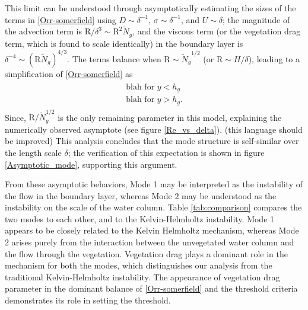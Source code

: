 \documentclass[aps,prl,twocolumn,superscriptaddress,10pt]{revtex4-1}  %
\newcommand{\hg}{h_g}
\newcommand{\Rey}{\text{R}}
\newcommand{\Ndg}{\tilde{N}_g}
\begin{document}
This limit can be understood through asymptotically estimating the sizes of the terms in \eqref{Orr-somerfield} using $D\sim \delta^{-1}$, $\sigma \sim \delta^{-1}$, and $U\sim \delta$; the magnitude of the advection term is $\Rey/\delta^3 \sim \Rey^2 \Ndg $, and the viscous term (or the vegetation drag term, which is found to scale identically) in the boundary layer is $\delta^{-4} \sim (\Rey \Ndg)^{4/3}$. 
The terms balance when $\Rey \sim {\Ndg}^{1/2}$ (or $\Rey \sim H/\delta$), leading to a simplification of \eqref{Orr-somerfield} as
\begin{align}
 \begin{split}
  \text{blah for $y<\hg$} \\
  \text{blah for $y>\hg$.}
 \end{split}
\end{align}
Since, $\Rey/\Ndg^{1/2}$ is the only remaining parameter in this model, explaining the numerically observed asymptote (see figure \ref{Re_vs_delta}). (this language should be improved)
This analysis concludes that the mode structure is self-similar over the length scale $\delta$; the verification of this expectation is shown in figure \ref{Asymptotic_mode}, supporting this argument.

From these asymptotic behaviors, Mode 1 may be interpreted as the instability of the flow in the boundary layer, whereas Mode 2 may be understood as the instability on the scale of the water column. 
Table \ref{tab:comparison} compares the two modes to each other, and to the Kelvin-Helmholtz instability. 
Mode 1 appears to be closely related to the Kelvin Helmholtz mechanism, whereas Mode 2 arises purely from the interaction between the unvegetated water column and the flow through the vegetation. 
Vegetation drag plays a dominant role in the mechanism for both the modes, which distinguishes our analysis from the traditional Kelvin-Helmholtz instability. 
The appearance of vegetation drag parameter in the dominant balance of \eqref{Orr-somerfield} and the threshold criteria demonstrates its role in setting the threshold.
\end{document}
